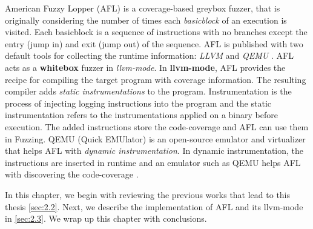American Fuzzy Lopper (AFL) \cite{afl_git} is a coverage-based greybox fuzzer, that is originally considering the number of times each \textit{basicblock} of an execution is visited. Each basicblock is a sequence of instructions with no branches except the entry (jump in) and exit (jump out) of the sequence. AFL is published with two default tools for collecting the runtime information: \textit{LLVM} \cite{llvm} and \textit{QEMU} \cite{bellard2005qemu}.  AFL acts as a \textbf{whitebox} fuzzer in \textit{llvm-mode}. In \textbf{llvm-mode}, AFL provides the recipe for compiling the target program with coverage information. The resulting compiler adds \textit{static instrumentations} to the program. Instrumentation is the process of injecting logging instructions into the program and the static instrumentation refers to the instrumentations applied on a binary before execution. The added instructions store the code-coverage and AFL can use them in Fuzzing. QEMU (Quick EMUlator) is an open-source emulator and virtualizer that helps AFL with \textit{dynamic instrumentation}. In dynamic instrumentation, the instructions are inserted in runtime and an emulator such as QEMU helps AFL with discovering the code-coverage \cite{afl_qemu}.

In this chapter, we begin with reviewing the previous works that lead to this thesis \ref{sec:2.2}. Next, we describe the implementation of AFL and its llvm-mode in \ref{sec:2.3}. We wrap up this chapter with conclusions.